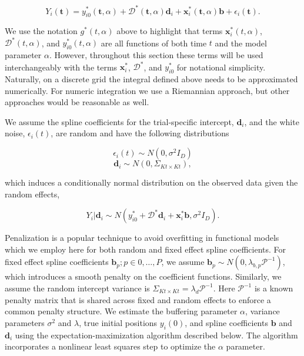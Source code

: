 \documentclass[preprint]{JASA}
\begin{document}
\begin{equation}
\label{eq:observed_mod} 
    Y_i(\mathbf{t}) = y_{i0}^*(\mathbf{t}, \alpha) +  \mathcal{D}^*(\mathbf{t}, \alpha)\mathbf{d}_i +  \mathbf{x}_i^*(\mathbf{t}, \alpha)\mathbf{b} + \epsilon_i(\mathbf{t}).
\end{equation}

\noindent We use the notation \(g^*(t, \alpha)\) above to highlight that
terms \(\mathbf{x}_i^*(t, \alpha)\), \(\mathcal{D}^*(t, \alpha)\), and
\(y_{i0}^*(t, \alpha)\) are all functions of both time \(t\) and the
model parameter \(\alpha\). However, throughout this section these terms
will be used interchangeably with the terms \(\mathbf{x}_i^*\),
\(\mathcal{D}^*\), and \(y_{i0}^*\) for notational simplicity.
Naturally, on a discrete grid the integral defined above needs to be
approximated numerically. For numeric integration we use a Riemannian
approach, but other approaches would be reasonable as well.

We assume the spline coefficients for the trial-specific intercept,
\(\mathbf{d}_i\), and the white noise, \(\epsilon_i(t)\), are random and
have the following distributions

\[\epsilon_i(t) \sim N(0, \sigma^2I_D)\]
\[\mathbf{d}_i \sim N(0, \Sigma_{Kt\times Kt}),\]

\noindent which induces a conditionally normal distribution on the
observed data given the random effects,

\[Y_i| \mathbf{d}_i \sim N\left(y_{i0}^* + \mathcal{D}^*\mathbf{d}_i+  \mathbf{x}_i^*\mathbf{b}, \sigma^2I_D \right).\]

\noindent Penalization is a popular technique to avoid overfitting in
functional models which we employ here for both random and fixed effect
spline coefficients. For fixed effect spline coefficients
\(\mathbf{b}_p; p\in 0,\ldots,P\), we assume
\(\mathbf{b}_p \sim N(0, \lambda_{b,p}\mathcal{P}^{-1})\), which
introduces a smooth penalty on the coefficient functions. Similarly, we
assume the random intercept variance is
\(\Sigma_{Kt\times Kt} = \lambda_d\mathcal{P}^{-1}\). Here
\(\mathcal{P}^{-1}\) is a known penalty matrix that is shared across
fixed and random effects to enforce a common penalty structure. We
estimate the buffering parameter \(\alpha\), variance parameters
\(\sigma^2\) and \(\lambda\), true initial positions \(y_i(0)\), and
spline coefficients \(\mathbf{b}\) and \(\mathbf{d}_i\) using the
expectation-maximization algorithm described below. The algorithm
incorporates a nonlinear least squares step to optimize the \(\alpha\)
parameter.
\end{document}
